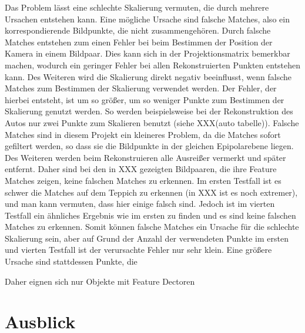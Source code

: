 Das Problem lässt eine schlechte Skalierung vermuten, die durch mehrere Ursachen entstehen kann. 
Eine mögliche Ursache sind falsche Matches, also ein korrespondierende Bildpunkte, die nicht zusammengehören.
Durch falsche Matches entstehen zum einen Fehler bei beim Bestimmen der Position der Kamera in einem Bildpaar.
Dies kann sich in der Projektionsmatrix bemerkbar machen, wodurch ein geringer Fehler bei allen Rekonstruierten Punkten entstehen kann.
Des Weiteren wird die Skalierung direkt negativ beeinflusst, wenn falsche Matches zum Bestimmen der Skalierung verwendet werden. 
Der Fehler, der hierbei entsteht, ist um so größer, um so weniger Punkte zum Bestimmen der Skalierung genutzt werden.
So werden beispielsweise bei der Rekonstruktion des Autos nur zwei Punkte zum Skalieren benutzt (siehe XXX(auto tabelle)).
Falsche Matches sind in diesem Projekt ein kleineres Problem, da die Matches sofort gefiltert werden, so dass sie die Bildpunkte in der gleichen Epipolarebene liegen.
Des Weiteren werden beim Rekonstruieren alle Ausreißer vermerkt und später entfernt.
Daher sind bei den in XXX gezeigten Bildpaaren, die ihre Feature Matches zeigen, keine falschen Matches zu erkennen.
Im ersten Testfall ist es schwer die Matches auf dem Teppich zu erkennen (in XXX ist es noch extremer), und man kann vermuten, dass hier einige falsch sind.
Jedoch ist im vierten Testfall ein ähnliches Ergebnis wie im ersten zu finden und es sind keine falschen Matches zu erkennen.
Somit können falsche Matches ein Ursache für die schlechte Skalierung sein, aber auf Grund der Anzahl der verwendeten Punkte im ersten und vierten Testfall ist der verursachte Fehler nur sehr klein.
Eine größere Ursache sind stattdessen Punkte, die 















Daher eignen sich nur Objekte mit 
Feature Dectoren 



\chapter{Ausblick}
